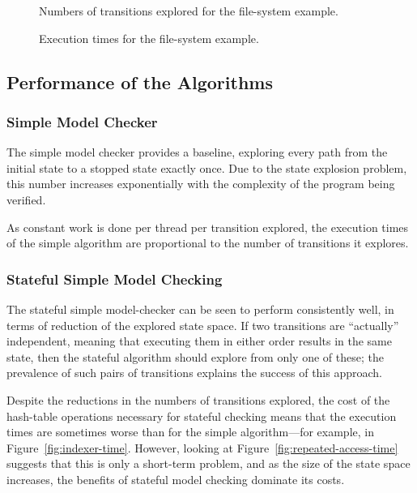 \documentclass[12pt,a4paper,twoside,openright]{report}
\begin{document}
\begin{figure}
	\def\svgwidth{\textwidth}
	
	\caption{Numbers of transitions explored
		for the file-system example.}
	\label{fig:fs-trans}

	\def\svgwidth{\textwidth}
	
	\caption{Execution times
		for the file-system example.}
	\label{fig:fs-time}
\end{figure}

\subsection{Performance of the Algorithms}

\subsubsection{Simple Model Checker}
The simple model checker provides a
baseline, exploring every path from
the initial state to a stopped state
exactly once. Due to the state explosion
problem, this number increases
exponentially with the complexity
of the program being verified.

As constant work is done per thread per transition
explored, the execution times of the simple
algorithm are
proportional to the number of transitions it
explores.

\subsubsection{Stateful Simple Model Checking}
The stateful simple model-checker can be
seen to perform consistently well, in terms
of reduction of the explored state space.
If two transitions are ``actually'' independent,
meaning that executing them in either order
results in the same state, then the stateful
algorithm should explore from only one of these;
the prevalence of such pairs of transitions
explains the success of this approach.

Despite the reductions in the numbers
of transitions explored, the cost of
the hash-table operations
necessary for stateful checking means that
the execution times
are sometimes worse than for the
simple algorithm---for example,
in Figure~\ref{fig:indexer-time}.
However, looking at Figure~\ref{fig:repeated-access-time}
suggests that this is only a short-term
problem, and as the size of the state
space increases, the benefits of
stateful model checking
dominate its costs.
\end{document}
